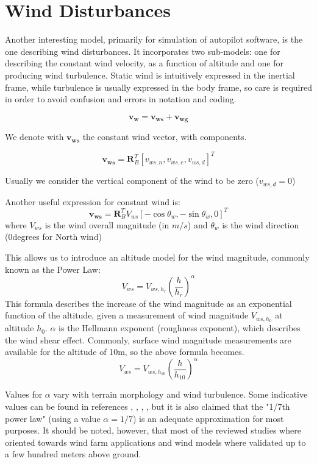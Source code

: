 \section{Wind Disturbances}
Another interesting model, primarily for simulation of autopilot software, is the one describing wind disturbances. It incorporates two sub-models: one for describing the constant wind velocity, as a function of altitude and one for producing wind turbulence. Static wind is intuitively expressed in the inertial frame, while turbulence is usually expressed in the body frame, so care is required in order to avoid confusion and errors in notation and coding.

\begin{equation}
	\bm{v_w} = \bm{v_{ws}} + \bm{v_{wg}}
\end{equation}

We denote with $\bm{v_{ws}}$ the constant wind vector, with components.

\begin{equation}
\bm{v_{ws}} = \bm{R}_B^T[v_{ws,n}, v_{ws,e}, v_{ws,d}]^T
\end{equation}

Usually we consider the vertical component of the wind to be zero ($v_{ws,d}=0$)

Another useful expression for constant wind is:
\begin{equation}
\bm{v_{ws}} = \bm{R}_B^TV_{ws}[-\cos\theta_w, -\sin\theta_w, 0]^T
\end{equation}
where $V_{ws}$ is the wind overall magnitude (in $m/s$) and $\theta_w$ is the wind direction (0degrees for North wind)

This allows us to introduce an altitude model for the wind magnitude, commonly known as the Power Law:
\begin{equation}
V_{ws} = V_{ws,h_r} \left(\frac{h}{h_r}\right)^\alpha
\end{equation}
This formula describes the increase of the wind magnitude as an exponential function of the altitude, given a measurement of wind magnitude $V_{ws,h_0}$ at altitude $h_0$. $\alpha$ is the Hellmann exponent (roughness exponent), which describes the wind shear effect. Commonly, surface wind magnitude measurements are available for the altitude of 10m, so the above formula becomes.
\begin{equation} \label{eq:staticWind10}
V_{ws} = V_{ws,h_{10}} \left(\frac{h}{h_{10}}\right)^\alpha
\end{equation}

Values for $\alpha$ vary with terrain morphology and wind turbulence. Some indicative values can be found in references \cite{Banuelos-Ruedas2011}, \cite{Peterson1978}, \cite{wiki:WindGrad}, \cite{wiki:Wind_profile_power_law}, but it is also claimed that the "1/7th power law" (using a value $\alpha=1/7$) is an adequate approximation for most purposes.
It should be noted, however, that most of the reviewed studies where oriented towards wind farm applications and wind models where validated up to a few hundred meters above ground.


